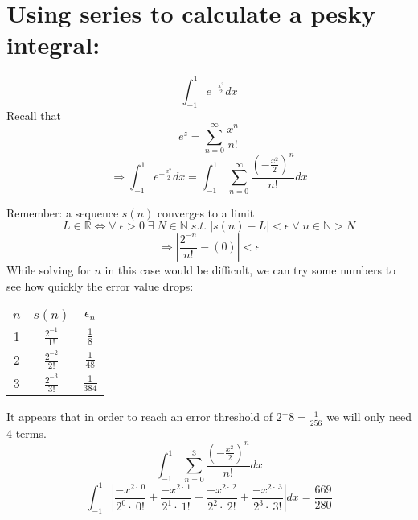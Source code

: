 \documentclass{article}
\begin{document}
\section{Using series to calculate a pesky integral:}
    \[\int _{-1 }^{1 \:}e^{-\frac{x^2}{2}}dx\]
    Recall that
    \[e^z= \sum_{n=0}^{\infty}\frac{x^n}{n!}\]
    \[\Rightarrow \int _{-1 }^{1 \:}e^{-\frac{x^2}{2}}dx=\int _{-1 \:}^{1 \:\:}\sum_{n=0}^{\infty}\frac{(-\frac{x^2}{2})^n}{n!} dx \]

    Remember: a sequence $s(n)$ converges to a limit
    \[L \in\mathbb{R}\iff\forall \; \epsilon > 0  \; \exists \; N \in \mathbb{N} \; s.t. \; |s(n) - L| < \epsilon \; \forall \; n \in \mathbb{N} > N\]
    \[ \Rightarrow |\frac{2^{-n}}{n!} - (0)| < \epsilon\]
    While solving for $n$ in this case would be difficult, we can try some numbers to see how quickly the error value drops:
    \begin{center}
     \begin{tabular}{||c | c | c||}
     \hline
     $n$ & $s(n)$ & $\epsilon_n$ \\ [0.5ex]
     1 & $\frac{2^{-1}}{1!}$ & $\frac{1}{8}$ \\
     2 & $\frac{2^{-2}}{2!}$ & $\frac{1}{48}$ \\
     3 & $\frac{2^{-3}}{3!}$ & $\frac{1}{384}$ \\ [1ex]
     \hline
    \end{tabular}
    \end{center}
    It appears that in order to reach an error threshold of $2^-8 = \frac{1}{256}$ we will only need 4 terms.
    \[\int _{-1 \:}^{1 \:\:}\sum_{n=0}^{3}\frac{(-\frac{x^2}{2})^n}{n!} dx \]
    \[\int _{-1}^1\left|\frac{-x^{2\cdot \:0}}{2^0\cdot \:0!}+\frac{-x^{2\cdot \:1}}{2^1\cdot \:1!}+\frac{-x^{2\cdot \:2}}{2^2\cdot \:2!}+\frac{-x^{2\cdot \:3}}{2^3\cdot \:3!}\right|dx=\frac{669}{280}\]
\end{document}
